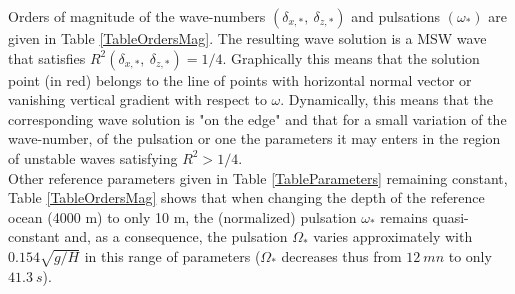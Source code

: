 \documentclass[a4paper,11pt]{article}
\begin{document}
Orders of magnitude of the wave-numbers $(\delta_{x,*},\ \delta_{z,*})$ and pulsations $(\omega_*)$ are given in Table \ref{TableOrdersMag}. The resulting wave solution is a MSW wave that satisfies $R^2(\delta_{x,*},\ \delta_{z,*})=1/4$. Graphically this means that the solution point (in red) belongs to the line of points with horizontal normal vector or vanishing vertical gradient with respect to $\omega$. Dynamically, this means that the corresponding wave solution is "on the edge" and that for a small variation of the wave-number, of the pulsation or one the parameters it may enters in the region of unstable waves satisfying $R^2>1/4$. \\
Other reference parameters given in Table \ref{TableParameters} remaining constant, Table \ref{TableOrdersMag} shows that when changing the depth of the reference ocean (4000 m) to only 10 m, the (normalized) pulsation $\omega_*$ remains quasi-constant and, as a consequence, the pulsation $\Omega_*$ varies approximately with $0.154 \sqrt{g/H}$ in this range of parameters ($\Omega_*$ decreases thus from $12\ mn$ to only $41.3\ s$).

\newpage
\end{document}
